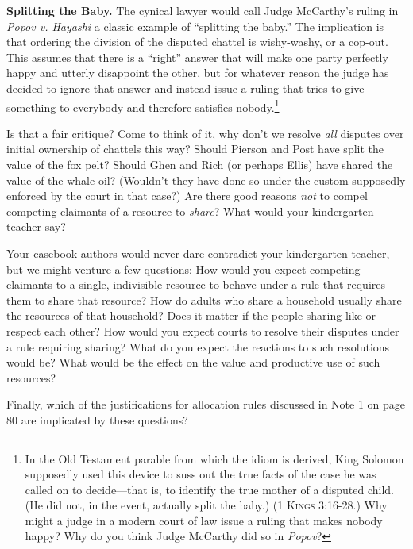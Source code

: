 
\item \textbf{Splitting the Baby.} The cynical lawyer would call Judge
McCarthy's ruling in \textit{Popov v. Hayashi} a classic example of ``splitting
the baby.'' The implication is that ordering the division of the disputed
chattel is wishy-washy, or a cop-out. This assumes that there is a ``right''
answer that will make one party perfectly happy and utterly disappoint the
other, but for whatever reason the judge has decided to ignore that answer and
instead issue a ruling that tries to give something to everybody and therefore
satisfies nobody.\footnote{In the Old Testament parable from which the idiom is
derived, King Solomon supposedly used this device to suss out the true facts of
the case he was called on to decide---that is, to identify the true mother of a
disputed child. (He did not, in the event, actually split the baby.) (1
\textsc{Kings} 3:16-28.) Why might a judge in a modern court of law issue a
ruling that makes nobody happy? Why do you think Judge McCarthy did so in
\textit{Popov}?}


Is that a fair critique? Come to think of it, why don't we resolve \textit{all}
disputes over initial ownership of chattels this way? Should Pierson and Post
have split the value of the fox pelt? Should Ghen and Rich (or perhaps Ellis)
have shared the value of the whale oil? (Wouldn't they have done so under the
custom supposedly enforced by the court in that case?) Are there good reasons
\textit{not} to compel competing claimants of a resource to \textit{share}? What
would your kindergarten teacher say?

Your casebook authors would never dare contradict your kindergarten teacher, but
we might venture a few questions: How would you expect competing claimants to a
single, indivisible resource to behave under a rule that requires them to share
that resource? How do adults who share a household usually share the resources
of that household? Does it matter if the people sharing like or respect each
other? How would you expect courts to resolve their disputes under a rule
requiring sharing? What do you expect the reactions to such resolutions would
be? What would be the effect on the value and productive use of such resources? 

Finally, which of the justifications for allocation rules discussed in Note 1 on
page 80 are implicated by these questions?


